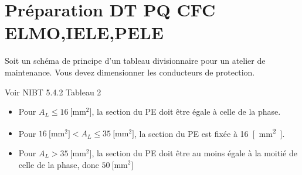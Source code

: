 \documentclass[a4paper,11pt,answers,addpoints]{exam}
\begin{document}
	\unframedsolutions
	\pointsinmargin
	\bracketedpoints
	
	\section*{Préparation DT PQ CFC ELMO,IELE,PELE}
	\begin{questions}
		\question
		Soit un schéma de principe d'un tableau divisionnaire pour un atelier de maintenance. Vous devez dimensionner les conducteurs de protection.		
		
		\begin{solution}
			Voir NIBT 5.4.2 Tableau 2
			\begin{itemize}
				\item Pour $A_L \leq \qty{16}{[\milli\metre\squared]}$, la section du PE doit être égale à celle de la phase.
				\item Pour $\qty{16}{[\milli\metre\squared]} < A_L \leq \qty{35}{[\milli\metre\squared]}$, la section du PE est fixée à \qty{16}{[\milli\metre\squared]}.
				\item Pour $A_L > \qty{35}{[\milli\metre\squared]}$, la section du PE doit être au moins égale à la moitié de celle de la phase, donc $\qty{50}{[\milli\metre\squared]}$
			\end{itemize}
		\end{solution}
	\end{questions}
\end{document}
